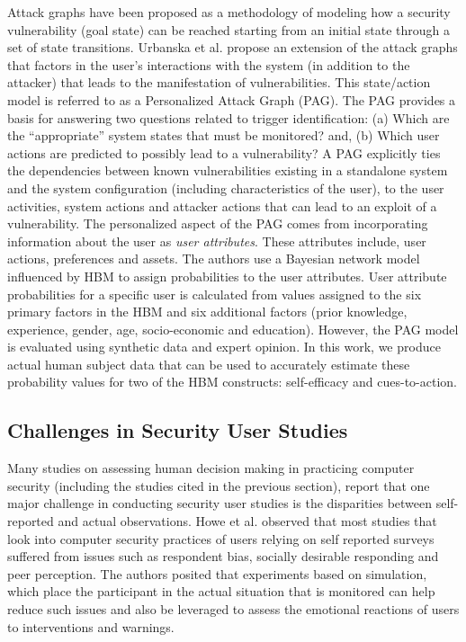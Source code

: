 Attack graphs \cite{ammann2002} have been proposed as a methodology of modeling how a security vulnerability (goal state) can be reached starting from an initial state through a set of state transitions. Urbanska et al. \citeyear{urbanska2013} propose an extension of the attack graphs that factors in the user's interactions  with the system (in addition to the attacker) that leads to the manifestation of vulnerabilities. This state/action model is referred to as a Personalized Attack Graph (PAG). The PAG provides a basis for answering two questions related to trigger identification: (a) Which are the ``appropriate'' system states that must be monitored? and, (b) Which user actions are predicted to possibly lead to a vulnerability? A PAG explicitly ties the dependencies between known vulnerabilities existing in a standalone system and the system configuration (including characteristics of the user), to the user activities, system actions and attacker actions that can lead to an exploit of a vulnerability. The personalized aspect of the PAG comes from incorporating information about the user as \textit{user attributes}. These attributes include, user actions, preferences and assets. The authors use a Bayesian network model influenced by HBM to assign probabilities to the user attributes. User attribute probabilities for a specific user is calculated from values assigned to the six primary factors in the HBM and six additional factors (prior knowledge, experience, gender, age, socio-economic and education). However, the PAG model is evaluated using synthetic data and expert opinion. In this work, we produce actual human subject data that can be used to accurately estimate these probability values for two of the HBM constructs: self-efficacy and cues-to-action.


\subsection{Challenges in Security User Studies}
Many studies on assessing human decision making in practicing computer security (including the studies cited in the previous section), report that one major challenge in conducting security user studies is the disparities between self-reported and actual observations. Howe et al. \citeyear{howe2012psychology} observed that most studies that look into computer security practices of users relying on self reported surveys suffered from issues such as respondent bias, socially desirable responding and peer perception. The authors posited that experiments based on simulation, which place the participant in the actual situation that is monitored can help reduce such issues and also be leveraged to assess the emotional reactions of users to interventions and warnings. 

